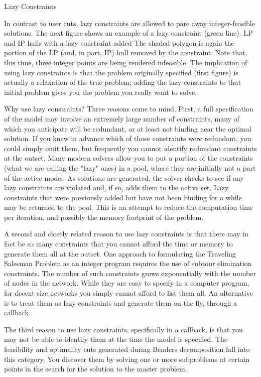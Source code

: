 {Lazy Constraints

In contrast to user cuts, lazy constraints are allowed to pare away integer-feasible solutions. The next figure shows an example of a lazy constraint (green line).
LP and IP hulls with a lazy constraint added
The shaded polygon is again the portion of the LP (and, in part, IP) hull removed by the constraint. Note that, this time, three integer points are being rendered infeasible. The implication of using lazy constraints is that the problem originally specified (first figure) is actually a relaxation of the true problem; adding the lazy constraints to that initial problem gives you the problem you really want to solve.

Why use lazy constraints? Three reasons come to mind. First, a full specification of the model may involve an extremely large number of constraints, many of which you anticipate will be redundant, or at least not binding near the optimal solution. If you knew in advance which of those constraints were redundant, you could simply omit them, but frequently you cannot identify redundant constraints at the outset. Many modern solvers allow you to put a portion of the constraints (what we are calling the "lazy" ones) in a pool, where they are initially not a part of the active model. As solutions are generated, the solver checks to see if any lazy constraints are violated and, if so, adds them to the active set. Lazy constraints that were previously added but have not been binding for a while may be returned to the pool. This is an attempt to reduce the computation time per iteration, and possibly the memory footprint of the problem.

A second and closely related reason to use lazy constraints is that there may in fact be so many constraints that you cannot afford the time or memory to generate them all at the outset. One approach to formulating the Traveling Salesman Problem as an integer program requires the use of subtour elimination constraints. The number of such constraints grows exponentially with the number of nodes in the network. While they are easy to specify in a computer program, for decent size networks you simply cannot afford to list them all. An alternative is to treat them as lazy constraints and generate them on the fly, through a callback.

The third reason to use lazy constraints, specifically in a callback, is that you may not be able to identify them at the time the model is specified. The feasibility and optimality cuts generated during Benders decomposition fall into this category. You discover them by solving one or more subproblems at certain points in the search for the solution to the master problem.

}
